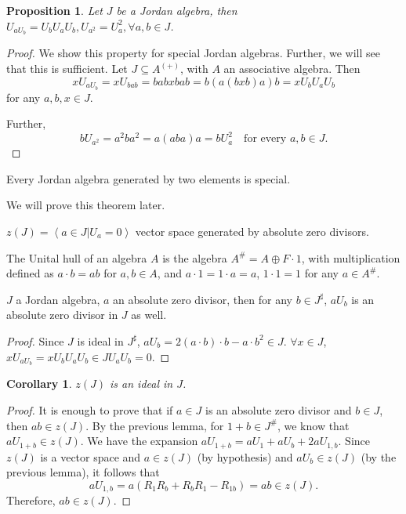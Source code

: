 \documentclass{article}
\newtheorem{proposition}[theorem]{Proposition}
\newtheorem{corollary}[theorem]{Corollary}
\def\<{\mathop{\langle}}
\def\>{\mathop{\rangle}}
\begin{document}
\begin{proposition}
Let $ J $ be a Jordan algebra, then $ U_{aU_b}=U_bU_aU_b, U_{a^2}=U_a^2 , \forall a,b \in J$.  
\end{proposition}

\begin{proof} 
We show this property for special Jordan algebras. Further, we will see that this is sufficient. Let $J \subseteq A^{(+)}$, with $A$ an associative algebra. Then  
\[ x U_{aU_b} = x U_{bab} = babxbab = b(a(bxb)a)b = x U_b U_a U_b \]  
for any $a,b,x \in J$.

Further, 
\[ bU_{a^2} = a^2ba^2 = a(aba)a = bU_a^2 \quad \text{for every } a,b \in J. \]  
\end{proof}

\begin{theorem}  
Every Jordan algebra generated by two elements is special.  
\end{theorem} 

We will prove this theorem later.

\begin{definition} 
$ z(J)=\< a \in J | U_a=0  \> $ vector space generated by absolute zero divisors.  
\end{definition}

\begin{definition}  
The Unital hull of an algebra $A$ is the algebra $A^\# = A \oplus F\cdot 1$, with multiplication defined as $a \cdot b = ab$ for $a,b \in A$, and $a \cdot 1 = 1 \cdot a = a$, $ 1 \cdot 1=1 $ for any $a \in A^\#$.  
\end{definition}

\begin{lemma} 
$ J $ a Jordan algebra, $ a $ an absolute zero divisor, then for any $ b \in J^{\sharp} $, $ aU_b $ is an absolute zero divisor in $ J $ as well.    
\end{lemma}

\begin{proof} 
Since $ J $ is ideal in $ J^{\sharp} $, $ aU_b=2(a \cdot b)\cdot b - a \cdot b^2 \in J $. $ \forall x \in J $, $ x U_{aU_b} =x U_b U_a U_b \in J U_a U_b =0$.     
\end{proof}

\begin{corollary}
$ z(J) $ is an ideal in $ J $.  
\end{corollary}

\begin{proof} 
It is enough to prove that if $a \in J$ is an absolute zero divisor and $b \in J$, then $ab \in z(J)$.  
By the previous lemma, for $1+b \in J^\#$, we know that $aU_{1+b} \in z(J)$.  
We have the expansion $aU_{1+b} = aU_1+aU_b+2aU_{1,b}$.  
Since $z(J)$ is a vector space and $a \in z(J)$ (by hypothesis) and $aU_b \in z(J)$ (by the previous lemma), it follows that  
\[ aU_{1,b}= a(R_1R_b + R_bR_1 - R_{1b})=ab \in z(J). \]  
Therefore, $ab \in z(J)$.  
\end{proof}
\end{document}
